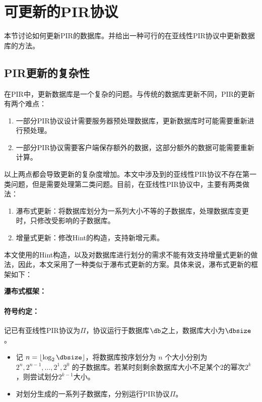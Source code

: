 \section{可更新的PIR协议}
\label{sec:handling-updates}
本节讨论如何更新PIR的数据库。并给出一种可行的在亚线性PIR协议中更新数据库的方法。

\subsection{PIR更新的复杂性}

在PIR中，更新数据库是一个复杂的问题。与传统的数据库更新不同，PIR的更新有两个难点：
\begin{enumerate}
    \item 一部分PIR协议设计需要服务器预处理数据库，更新数据库时可能需要重新进行预处理。
    \item 一部分PIR协议需要客户端保存额外的数据，这部分额外的数据可能需要重新计算。
\end{enumerate}

以上两点都会导致更新的复杂度增加。本文中涉及到的亚线性PIR协议不存在第一类问题，但是需要处理第二类问题。目前，在亚线性PIR协议中，主要有两类做法：
\begin{enumerate}
    \item 瀑布式更新\cite{USENIX:KogCor21}：将数据库划分为一系列大小不等的子数据库，处理数据库变更时，只修改受影响的子数据库。
    \item 增量式更新\cite{USENIX:MZRA22}：修改Hint的构造，支持新增元素。
\end{enumerate}

本文使用的Hint构造，以及对数据库进行划分的需求不能有效支持增量式更新的做法，因此，本文采用了一种类似于瀑布式更新的方案。具体来说，瀑布式更新的框架如下：

    \begin{mdframed}
    \centering
    \textbf{瀑布式框架：}
        \raggedright
        \paragraph{符号约定：} 记已有亚线性PIR协议为$\Pi$，协议运行于数据库$\db$之上，数据库大小为$\dbsize$。
        \begin{itemize}
            \item 记 $n = \lfloor\log_2{\dbsize}\rfloor$，将数据库按序划分为 $n$ 个大小分别为 $2^n, 2^{n-1}, \dots, 2^1, 2^0$ 的子数据库。若某时刻剩余数据库大小不足某个2的幂次$2^k$，则尝试划分$2^{k-1}$大小。
            \item 对划分生成的一系列子数据库，分别运行PIR协议$\Pi$。
        \end{itemize}
    \end{mdframed}
    \label{fig:checklist}

